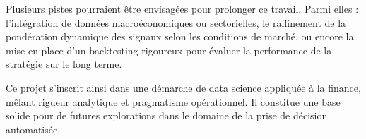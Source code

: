 \documentclass[a4paper,12pt]{article}
\begin{document}
Plusieurs pistes pourraient être envisagées pour prolonger ce travail. Parmi elles : l’intégration de données macroéconomiques ou sectorielles, le raffinement de la pondération dynamique des signaux selon les conditions de marché, ou encore la mise en place d’un backtesting rigoureux pour évaluer la performance de la stratégie sur le long terme.

Ce projet s’inscrit ainsi dans une démarche de data science appliquée à la finance, mêlant rigueur analytique et pragmatisme opérationnel. Il constitue une base solide pour de futures explorations dans le domaine de la prise de décision automatisée.
\end{document}
